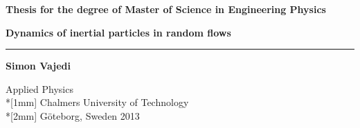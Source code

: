 \documentclass[a4paper,11pt,twoside,openright]{UGthesis}
\newcommand\ffam{\sffamily}
\newcommand\fser{\bfseries}
\newcommand\fsh{\upshape}
\newcommand\blankpage{\thispagestyle{empty}\mbox{}\newpage}
\newcommand{\titel}{Dynamics of inertial particles in random flows}
\begin{document}
%
%

%


\setcounter{page}{1}

%
%

\thispagestyle{empty}


\begin{center}
  {\fsh\ffam\fser Thesis for the degree of Master of Science in Engineering Physics}
\end{center}


\vspace*{0.5cm}

\begin{center}
{\upshape\sffamily\bfseries\LARGE \titel}
\end{center}

\vspace*{2mm}
\begin{center}
        \rule{110mm}{2pt}
\end{center}

\vspace*{4mm}
\begin{center}
  {\fsh\ffam\fser\Large Simon Vajedi}\\
\end{center}
\vfill

\begin{center}
\end{center}

\vfill
\begin{center}
        {\ffam\fsh Applied Physics\\*[1mm]
        Chalmers University of Technology\\*[2mm]
        Göteborg, Sweden 2013}
\end{center}
\end{document}
